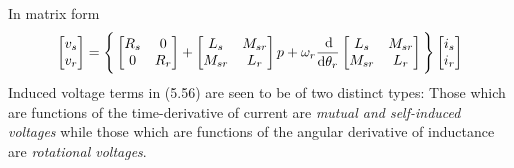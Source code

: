 \documentclass[a4paper,numbers=noenddot,12pt]{scrbook}
\begin{document}
        In matrix form
        \begin{equation}
            \begin{bmatrix}
                v_s \\ v_r
            \end{bmatrix} 
            = \Bigg\{
                \begin{bmatrix}
                    R_s  & 0 \\ 0 & R_r 
                \end{bmatrix}
                +
                \begin{bmatrix}
                    L_s  & M_{sr} \\ M_{sr} & L_r 
                \end{bmatrix} 
                p + \omega_r \frac{\dif}{\dif \theta_r} 
                \begin{bmatrix}
                    L_s  & M_{sr} \\ M_{sr} & L_r 
                \end{bmatrix}
            \Bigg \}
            \begin{bmatrix}
                i_s \\ i_r 
            \end{bmatrix}
        \end{equation}
        Induced voltage terms in (5.56) are seen to be of two distinct types: Those which are functions of the time-derivative of current are \emph{mutual and self-induced voltages} while those which are functions of the angular derivative of inductance are \emph{rotational voltages}.
\end{document}

